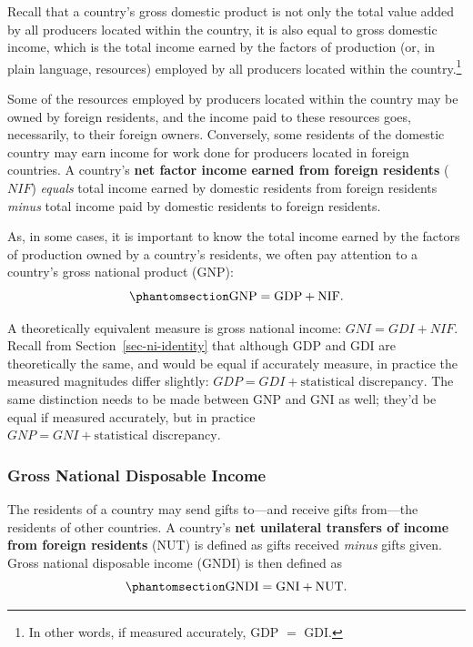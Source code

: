 \documentclass[
  letterpaper,
]{book}
\theoremstyle{plain}
\theoremstyle{remark}
\begin{document}

Recall that a country's gross domestic product is not only the total
value added by all producers located within the country, it is also
equal to gross domestic income, which is the total income earned by the
factors of production (or, in plain language, resources) employed by all
producers located within the country.\footnote{In other words, if
  measured accurately, GDP \(=\) GDI.}

Some of the resources employed by producers located within the country
may be owned by foreign residents, and the income paid to these
resources goes, necessarily, to their foreign owners. Conversely, some
residents of the domestic country may earn income for work done for
producers located in foreign countries. A country's \textbf{net factor
income earned from foreign residents} (\(NIF\)) \emph{equals} total
income earned by domestic residents from foreign residents \emph{minus}
total income paid by domestic residents to foreign residents.

As, in some cases, it is important to know the total income earned by
the factors of production owned by a country's residents, we often pay
attention to a country's gross national product (GNP):
\begin{equation}\phantomsection\label{eq-gnp}{
\text{GNP}=\text{GDP}+\text{NIF}.
}\end{equation}

A theoretically equivalent measure is gross national income:
\(GNI=GDI+NIF\). Recall from Section~\ref{sec-ni-identity} that although
GDP and GDI are theoretically the same, and would be equal if accurately
measure, in practice the measured magnitudes differ slightly:
\(GDP=GDI+\text{statistical discrepancy}\). The same distinction needs
to be made between GNP and GNI as well; they'd be equal if measured
accurately, but in practice \(GNP=GNI+\text{statistical discrepancy}\).

\subsubsection{Gross National Disposable Income}\label{sec-gndi}


The residents of a country may send gifts to---and receive gifts
from---the residents of other countries. A country's \textbf{net
unilateral transfers of income from foreign residents} (NUT) is defined
as gifts received \emph{minus} gifts given. Gross national disposable
income (GNDI) is then defined as
\begin{equation}\phantomsection\label{eq-gndi}{
\text{GNDI}=\text{GNI}+\text{NUT}.
}\end{equation}
\end{document}

